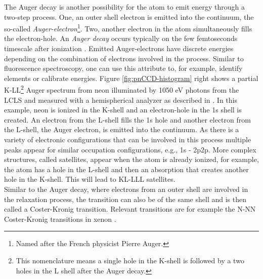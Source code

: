 %
The Auger decay is another possibility for the atom to emit energy through a two-step process. One, an outer shell electron is emitted into the continuum, the so-called \textit{Auger-electron}\footnote{Named after the French physicist Pierre Auger.}. Two, another electron in the atom simultaneously fills the electron-hole. An \textit{Auger decay} occurs typically on the few femtoseconds timescale after ionization \citep{Krause-1970-PhysLettA}. Emitted Auger-electrons have discrete energies depending on the combination of electrons involved in the process. Similar to fluorescence spectroscopy, one can use this attribute to, for example, identify elements or calibrate energies. Figure \ref{fig:pnCCD-histogram} right shows a partial K-LL\footnote{This nomenclature means a single hole in the K-shell is followed by a two holes in the L shell after the Auger decay.} Auger spectrum from neon illuminated by 1050 eV photons from the LCLS and measured with a hemispherical analyzer as described in \citep{Bucher-2014-Unpublished}. In this example, neon is ionized in the K-shell and an electron-hole in the 1s shell is created. An electron from the L-shell fills the 1s hole and another electron from the L-shell, the Auger electron, is emitted into the continuum. As there is a variety of electronic configurations that can be involved in this process multiple peaks appear for similar occupation configurations, e.g., 1s - 2p2p. More complex structures, called satellites, appear when the atom is already ionized, for example, the atom has a hole in the L-shell and then an absorption that creates another hole in the K-shell. This will lead to KL-LLL satellites.\\
Similar to the Auger decay, where electrons from an outer shell are involved in the relaxation process, the transition can also be of the same shell and is then called a Coster-Kronig transition. Relevant transitions are for example the N-NN Coster-Kronig transitions in xenon \citep{Coster-1935-Physica}.
%
%
%
%
